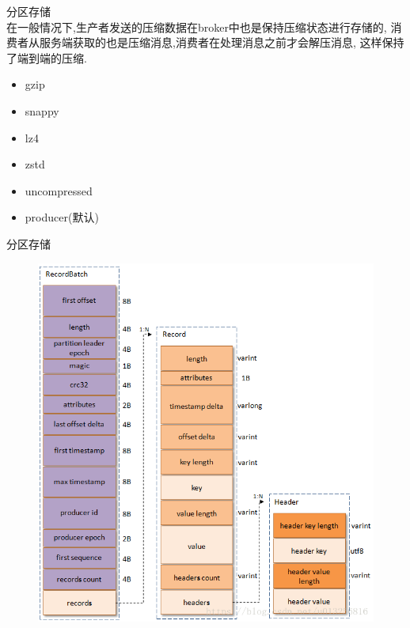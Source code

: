 \begin{frame}[plain,t]{分区存储} %
     \\  \vspace{2ex}
    在一般情况下,生产者发送的压缩数据在broker中也是保持压缩状态进行存储的,
    消费者从服务端获取的也是压缩消息,消费者在处理消息之前才会解压消息,
    这样保持了端到端的压缩.
    
    \begin{itemize}
        \item gzip
        \item snappy
        \item lz4
        \item zstd
        \item uncompressed
        \item producer(默认)
    \end{itemize}
    
    
    
\end{frame}
\begin{frame}[plain,t]{分区存储} %
     \\  %
    \vspace{-1ex}
    \begin{figure}
        \centering
        \includegraphics[width=0.65\linewidth]{image/0403}
        \label{fig:0403}
    \end{figure}
    
    
    
\end{frame}
